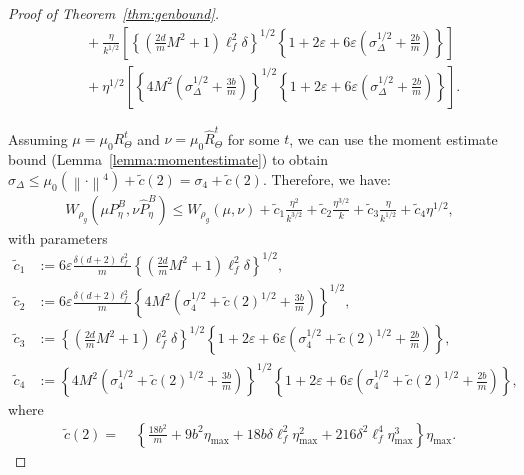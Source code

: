 \documentclass{article}
\newcommand{\norm}[1]{\left\lVert#1\right\rVert} %
\begin{document}
\begin{proof}[Proof of Theorem~\ref{thm:genbound}]
\begin{align*}
        &\quad+\frac{\eta }{k^{1/2}} \left[ \left\{ \left(\frac{2d}{m} M^2 + 1 \right) \ell_f^2 \delta  \right\}^{1/2} \left\{1 +2\varepsilon + 6\varepsilon  \left(\sigma_\Delta^{1/2} + \frac{2b}{m} \right) \right\} \right]\\
        &\quad+ \eta^{1/2} \left[ \left\{4M^2 \left(\sigma_\Delta^{1/2} +   \frac{3b}{m}\right)\right\}^{1/2}\left\{1 +2\varepsilon + 6\varepsilon  \left(\sigma_\Delta^{1/2} + \frac{2b}{m} \right) \right\}\right].
	\end{align*}
	
	Assuming  $\mu = \mu_0 R_\Theta^t$ and $\nu = \mu_0 \widehat{R}_\Theta^t$ for some $t$, we can use the moment estimate bound (Lemma~\ref{lemma:momentestimate}) to obtain $\sigma_\Delta \leq \mu_0(\norm{\cdot}^4) + \tilde{c}(2) = \sigma_4 + \tilde{c}(2)$.
	Therefore, we have:
	\begin{align*}
		W_{\rho_g} (\mu P_\eta^B, \nu \widehat{P}_\eta^B) \leq  W_{\rho_g}(\mu, \nu) + \tilde{c}_1 \frac{\eta^2}{k^{3/2}}  + \tilde{c}_2 \frac{\eta^{3/2}}{k} + \tilde{c}_3 \frac{\eta }{k^{1/2}}  +  \tilde{c}_4 \eta^{1/2},
	\end{align*}
	with parameters
	\begin{align*}
		\tilde{c}_1 &:= 6\varepsilon\frac{\delta (d+2) \ell_f^2}{m}  \left\{ \left(\frac{2d}{m} M^2 + 1 \right) \ell_f^2 \delta  \right\}^{1/2}, \\
		\tilde{c}_2 &:= 6\varepsilon\frac{\delta (d+2) \ell_f^2}{m}  \left\{4M^2 \left( \sigma_4^{1/2} + \tilde{c}(2)^{1/2} +   \frac{3b}{m}\right)\right\}^{1/2},\\
		\tilde{c}_3 &:= \left\{ \left(\frac{2d}{m} M^2 + 1 \right) \ell_f^2 \delta  \right\}^{1/2} \left\{1 +2\varepsilon + 6\varepsilon  \left( \sigma_4^{1/2} + \tilde{c}(2)^{1/2}+ \frac{2b}{m} \right) \right\}, \\
		\tilde{c}_4 &:= \left\{4M^2 \left( \sigma_4^{1/2} + \tilde{c}(2)^{1/2} +   \frac{3b}{m}\right)\right\}^{1/2}\left\{1 +2\varepsilon + 6\varepsilon  \left( \sigma_4^{1/2} + \tilde{c}(2)^{1/2} + \frac{2b}{m} \right) \right\},
	\end{align*}
	where
	\begin{align*}
		\tilde{c}(2) =&\;  \left\{ \frac{18b^2}{m} + 9b^2 \eta_{\max} + 18  b \delta \ell_f^2  \eta_{\max}^2+216 \delta^2 \ell_f^{4} \eta_{\max}^{3} \right\} \eta_{\max}.
	\end{align*}
	

\end{proof}
\end{document}
